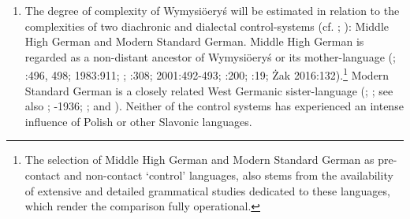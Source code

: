 \documentclass[output=paper]{langscibook}
\begin{document}
\begin{enumerate}
\item
The degree of complexity of Wymysiöeryś will be estimated in relation to the complexities of two diachronic and dialectal control-systems (cf. \citealt{Deutscher2009}; \citealt{Dahl2009}): Middle High German and Modern Standard German. Middle High German is regarded as a non-distant ancestor of Wymysiöeryś or its mother-language (\citealt{Kleczkowski1920}; \citealt{Wiesinger1980}:496, 498; 1983:911; \citealt{Morciniec1984}; \citealt{ZieniukowaWicherkiewicz1997}:308; 2001:492-493; \citealt{Wicherkiewicz1998}:200; \citealt{WicherkiewiczOlko2016}:19; Żak 2016:132).\footnote{The selection of Middle High German and Modern Standard German as pre-contact and non-contact ‘control’ languages, also stems from the availability of extensive and detailed grammatical studies dedicated to these languages, which render the comparison fully operational.} Modern Standard German is a closely related West Germanic sister-language (\citealt{ChromikDolatowski2013}; \citealt{ChromikWicherkiewicz2013}; see also \citealt{Lasatowicz1992}; \citealt{Mojmir1930}-1936; \citealt{Kleczkowski1920}; and \citealt{Ritchie2012}). Neither of the control systems has experienced an intense influence of Polish or other Slavonic languages. 


\end{enumerate}
\end{document}
